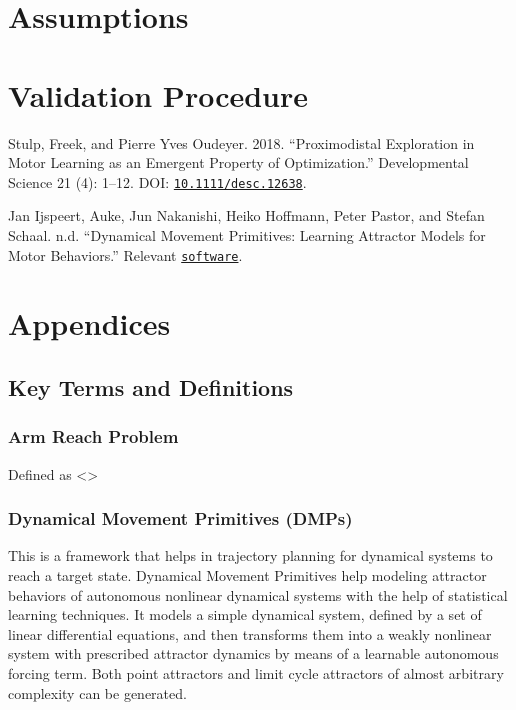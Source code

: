 \documentclass[10pt]{article}
\begin{document}
\section{Assumptions}

\section{Validation Procedure}

\begin{thebibliography}{5}
 Stulp, Freek, and Pierre Yves Oudeyer. 2018. “Proximodistal Exploration in Motor Learning as an Emergent Property of Optimization.” Developmental Science 21 (4): 1–12. DOI: \href{https://doi.org/10.1111/desc.12638}{\texttt{10.1111/desc.12638}}.

Jan Ijspeert, Auke, Jun Nakanishi, Heiko Hoffmann, Peter Pastor, and Stefan Schaal. n.d. “Dynamical Movement Primitives: Learning Attractor Models for Motor Behaviors.” Relevant  \href{http://www-clmc.usc.edu/Resources/Software}{\texttt{software}}.
\end{thebibliography}

\pagebreak

\appendix
\section*{Appendices}
\renewcommand{\thesubsection}{\Alph{subsection}}
\subsection{Key Terms and Definitions}\label{subsec:appendix_terms_def}

\subsubsection{Arm Reach Problem}
Defined as <>

\subsubsection{Dynamical Movement Primitives (DMPs)}
This is a framework that helps in trajectory planning for dynamical systems to reach a target state. Dynamical Movement Primitives help modeling attractor behaviors of autonomous nonlinear dynamical systems with the help of statistical learning techniques. It models a simple dynamical system, defined by a set of linear differential equations, and then transforms them into a weakly nonlinear system with prescribed attractor dynamics by means of a learnable autonomous forcing term. Both point attractors and limit cycle attractors of almost arbitrary complexity can be generated.
\end{document}
